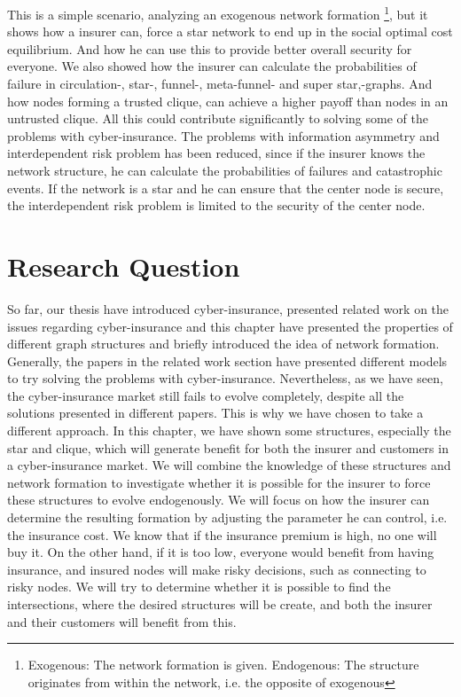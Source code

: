 This is a simple scenario, analyzing an exogenous network formation \footnote{Exogenous: The network formation is given. Endogenous: The structure originates from within the network, i.e. the opposite of exogenous}, 
but it shows how a insurer can, force a star network to end up in the social optimal cost equilibrium. And how he can use this to provide better overall security for everyone. We also showed how the insurer can calculate the probabilities of failure in circulation-, star-, funnel-, meta-funnel- and super star,-graphs.   And how nodes forming a trusted clique, can achieve a higher payoff than nodes in an untrusted clique. 
All this could contribute significantly to solving some of the problems with cyber-insurance. The problems with information asymmetry and interdependent risk problem has been reduced, since if the insurer knows the network structure, he can calculate the probabilities of failures and catastrophic events. If the network is a star and he can ensure that the center node is secure, the interdependent risk problem is limited to the security of the center node. 

\section{Research Question}
So far, our thesis have introduced cyber-insurance, presented related work on the issues regarding cyber-insurance and this chapter have presented the properties of different graph structures and briefly introduced the idea of network formation. Generally, the papers in the related work section have presented different models to try solving the problems with cyber-insurance. Nevertheless, as we have seen, the cyber-insurance market still fails to evolve completely, despite all the solutions presented in different papers. This is why we have chosen to take a different approach.
In this chapter, we have shown some structures, especially the star and clique, which will generate benefit for both the insurer and customers in a cyber-insurance market. We will combine the knowledge of these structures and network formation to investigate whether it is possible for the insurer to force these structures to evolve endogenously. We will focus on how the insurer can determine the resulting formation by adjusting the parameter he can control, i.e. the insurance cost. We know that if the insurance premium is high, no one will buy it. On the other hand, if it is too low, everyone would benefit from having insurance, and insured nodes will make risky decisions, such as connecting to risky nodes. We will try to determine whether it is possible to find the intersections, where the desired structures will be create, and both the insurer and their customers will benefit from this.


